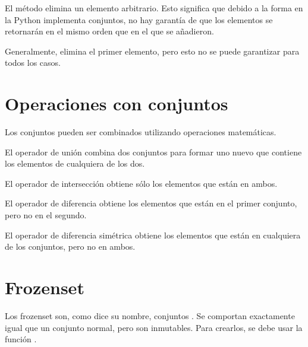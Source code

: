 
El método  elimina un elemento arbitrario.
Esto significa que debido a la forma en la Python implementa conjuntos, no hay garantía de que los elementos se retornarán en el mismo orden que en el que se añadieron.

Generalmente, elimina el primer elemento, pero esto no se puede garantizar para todos los casos.


\section{Operaciones con conjuntos}

Los conjuntos pueden ser combinados utilizando operaciones matemáticas.

El operador de unión \ttt{|} combina dos conjuntos para formar uno nuevo que contiene los elementos de cualquiera de los dos.


El operador de intersección \ttt{\&} obtiene sólo los elementos que están en ambos.


El operador de diferencia \ttt{-} obtiene los elementos que están en el primer conjunto, pero no en el segundo.


El operador de diferencia simétrica \ttt{\^} obtiene los elementos que están en cualquiera de los conjuntos, pero no en ambos.


\section{Frozenset}

Los frozenset son, como dice su nombre, conjuntos .
Se comportan exactamente igual que un conjunto normal, pero son inmutables.
Para crearlos, se debe usar la función .

